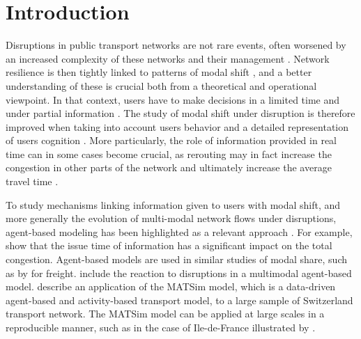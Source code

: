 \documentclass[3p,times,procedia]{elsarticle}
\begin{document}



\section{Introduction}



Disruptions in public transport networks are not rare events, often worsened by an increased complexity of these networks and their management \citep{dekker2018next}. Network resilience is then tightly linked to patterns of modal shift \citep{stamos2015impact}, and a better understanding of these is crucial both from a theoretical and operational viewpoint. In that context, users have to make decisions in a limited time and under partial information \citep{lyons2006role}. The study of modal shift under disruption is therefore improved when taking into account users behavior and a detailed representation of users cognition \citep{brisbois2010processus}. More particularly, the role of information provided in real time can in some cases become crucial, as rerouting may in fact increase the congestion in other parts of the network and ultimately increase the average travel time \citep{chatterjee2002driver,chorus2006travel}.


To study mechanisms linking information given to users with modal shift, and more generally the evolution of multi-modal network flows under disruptions, agent-based modeling has been highlighted as a relevant approach \citep{leng2020role}. For example, \cite{leng2020issue} show that the issue time of information has a significant impact on the total congestion. Agent-based models are used in similar studies of modal share, such as by \cite{baindur2011agent} for freight. \cite{ambra2019should} include the reaction to disruptions in a multimodal agent-based model. \cite{raney2003agent} describe an application of the MATSim model, which is a data-driven agent-based and activity-based transport model, to a large sample of Switzerland transport network. The MATSim model can be applied at large scales in a reproducible manner, such as in the case of Ile-de-France illustrated by \cite{horl2020reproducible}.
\end{document}

